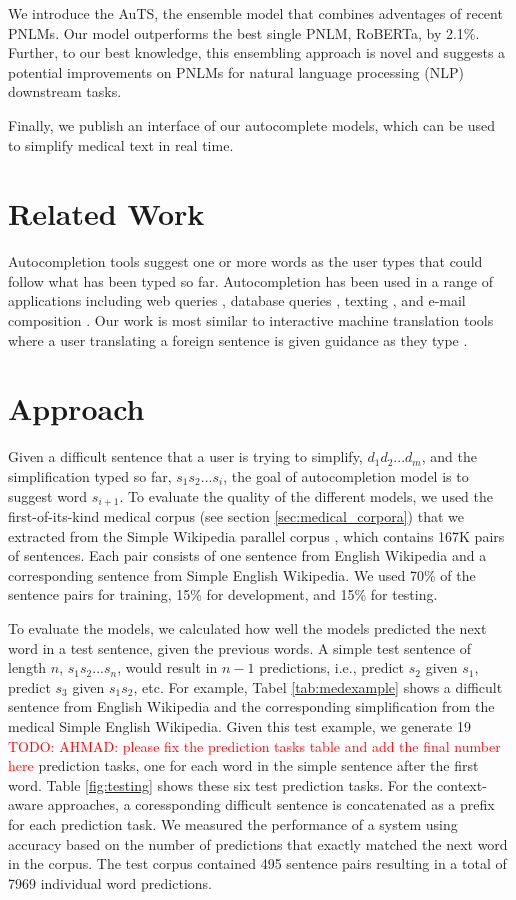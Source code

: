 \documentclass[11pt]{article}
\newcommand{\todo}[1]{\textcolor{red}{TODO: #1}}
\begin{document}
 We introduce the AuTS, the ensemble model that combines adventages of recent PNLMs. Our model outperforms the best single PNLM, RoBERTa, by 2.1\%. Further, to our best knowledge, this ensembling approach is novel and suggests a potential improvements on PNLMs for natural language processing (NLP) downstream tasks.

 Finally, we publish an interface of our autocomplete models, which can be used to simplify medical text in real time.

\section{Related Work}

Autocompletion tools suggest one or more words as the user types that could follow what has been typed so far. Autocompletion has been used in a range of applications including web queries \cite{cai2016survey}, database queries \cite{khoussainova2010snipsuggest}, texting \cite{dunlop2000predictive}, and e-mail composition \cite{dai2019gmail}. Our work is most similar to interactive machine translation tools where a user translating a foreign sentence is given guidance as they type \cite{green-etal-2014-human}.

\section{Approach}

Given a difficult sentence that a user is trying to simplify, $d_1 d_2 ... d_m$, and the simplification typed so far, $s_1 s_2 ... s_i$, the goal of autocompletion model is to suggest word $s_{i+1}$. To evaluate the quality of the different models, we used the first-of-its-kind medical corpus (see section \ref{sec:medical_corpora}) that we extracted from the Simple Wikipedia parallel corpus \cite{kauchak2013improving}, which contains 167K pairs of sentences. Each pair consists of one sentence from English Wikipedia and a corresponding sentence from Simple English Wikipedia. We used 70\% of the sentence pairs for training, 15\% for development, and 15\% for testing. 

To evaluate the models, we calculated how well the models predicted the next word in a test sentence, given the previous words.  A simple test sentence of length $n$, $s_1 s_2 ... s_n$, would result in $n-1$ predictions, i.e., predict $s_2$ given $s_1$, predict $s_3$ given $s_1 s_2$, etc.  For example, Tabel \ref{tab:medexample} shows a difficult sentence from English Wikipedia and the corresponding simplification from the medical Simple English Wikipedia. Given this test example, we generate 19 \todo{AHMAD: please fix the prediction tasks table and add the final number here} prediction tasks, one for each word in the simple sentence after the first word.  Table \ref{fig:testing} shows these six test prediction tasks.  For the context-aware approaches, a coressponding difficult sentence is concatenated as a prefix for each prediction task. We measured the performance of a system using accuracy based on the number of predictions that exactly matched the next word in the corpus.  The test corpus contained 495 sentence pairs resulting in a total of 7969 individual word predictions.
\end{document}
